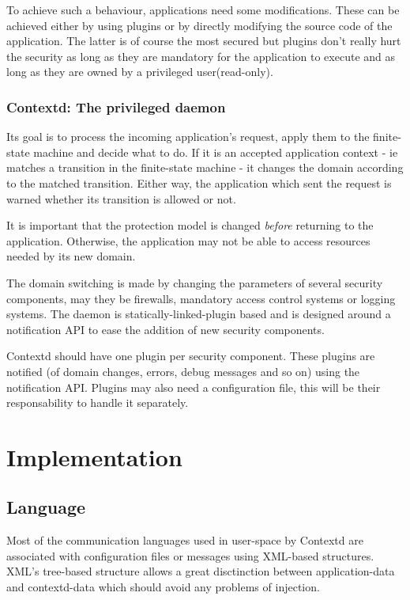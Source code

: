 \documentclass[conference]{IEEEtran}
\begin{document}
			To achieve such a behaviour, applications need some modifications. These can be achieved either by using plugins or 
			by directly modifying the source code of the application. The latter is of course the most secured but plugins don't really hurt the security
			as long as they are mandatory for the application to execute and as long as they are owned by a privileged user(read-only).

		\subsubsection{Contextd: The privileged daemon}
			Its goal is to process the incoming application's request, apply them to the finite-state machine and decide what to do.
			If it is an accepted application context - ie matches a transition in the finite-state machine - it changes the domain according to the matched transition.
			Either way, the application which sent the request is warned whether its transition is allowed or not.

			It is important that the protection model is changed \emph{before} returning to the application. Otherwise, the application may not
			be able to access resources needed by its new domain.

			The domain switching is made by changing the parameters of several security components, may they be firewalls, mandatory access control systems or logging systems.
			The daemon is statically-linked-plugin based and is designed around a notification API to ease the addition of new security components.

			Contextd should have one plugin per security component. These plugins are notified (of domain changes, errors, debug messages and so on)
			using the notification API. Plugins may also need a configuration file, this will be their responsability to handle it separately.


\section{Implementation}

	\subsection{Language}
		Most of the communication languages used in user-space by Contextd are associated with configuration files or messages using XML-based structures.
		XML's tree-based structure allows a great disctinction between application-data and contextd-data which should avoid any problems of injection.
\end{document}
